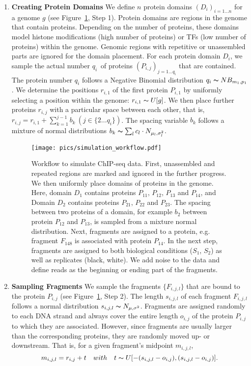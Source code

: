 \begin{enumerate}[label=\hspace{4cm} \arabic*. Step, leftmargin=1.35cm]
 \item \textbf{Creating Protein Domains}
We define $n$ protein domains $(D_i)_{i=1 \ldots n}$ for a genome $g$ (see Figure~\ref{pic_sim_workflow}, Step 1).
Protein domains are regions in the genome that contain proteins.
Depending on the number of proteins, these domains model histone modifications (high number of proteins) or TFs (low number of proteins) within the genome.
Genomic regions with repetitive or unassembled parts are ignored for the domain placement. 
For each protein domain $D_i$, we sample the actual number $q_i$~of proteins $(P_{i,j})_{j=1 \ldots q_i}$ that are contained.
The protein number $q_i$ follows a Negative Binomial distribution $q_i \thicksim NB_{m_1, p_1}$.
We determine the positions $r_{i,1}$ of the first protein $P_{i,1}$ by uniformly selecting a position within the genome: $r_{i,1} \thicksim U[g]$.
We then place further proteins $r_{i, j}$ with a particular space between each other, that is, $r_{i,j} = r_{i,1} + \sum_{k=1}^{j-1} b_k \ (j \in \{2 \ldots q_i\})$. 
The spacing variable $b_k$ follows a mixture of normal distributions $b_k \thicksim \sum_{l} c_l \cdot N_{\mu_l, \sigma_l^2}$.

\begin{figure}[H]
\begin{center}
 \texttt{[image: pics/simulation\_workflow.pdf]}
\end{center}
\caption[ChIP-seq simulation workflow]{Workflow to simulate ChIP-seq data. 
First, unassembled and repeated regions are marked and ignored in the further progress. 
We then uniformly place domains of proteins in the genome. 
Here, domain $D_1$ contains proteins $P_{11}$, $P_{12}$, $P_{13}$ and $P_{14}$, and Domain $D_2$ contains proteins $P_{21}$, $P_{22}$ and $P_{23}$. 
The spacing between two proteins of a domain, for example $b_2$ between protein $P_{12}$ and $P_{13}$, is sampled from a mixture normal distribution. 
Next, fragments are assigned to a protein, e.g. fragment $F_{148}$ is associated with protein $P_{14}$.
In the next step, fragments are assigned to both biological conditions ($S_1$, $S_2$) as well as replicates (black, white).
We add noise to the data and define reads as the beginning or ending part of the fragments.
}
\label{pic_sim_workflow}
\end{figure}
\newpage

 \item \textbf{Sampling Fragments}
We sample the fragments $\{F_{i,j,l}\}$ that are bound to the protein $P_{i,j}$ (see Figure~\ref{pic_sim_workflow}, Step 2). 
The length $s_{i,j,l}$ of each fragment $F_{i,j,l}$ follows a normal distribution $s_{i,j,l} \thicksim N_{\mu, \sigma^2}$.
Fragments are assigned randomly to each DNA strand and always cover the entire length $o_{i,j}$ of the protein $P_{i,j}$ to which they are associated. 
However, since fragments are usually larger than the corresponding proteins, they are randomly moved up- or downstream.
That is, for a given fragment's midpoint $m_{i,j,l}$,
$$m_{i,j,l} = r_{i,j} + t \quad with \quad t \thicksim U[-(s_{i,j,l} - o_{i,j}), (s_{i,j,l} - o_{i,j})].$$


\end{enumerate}
